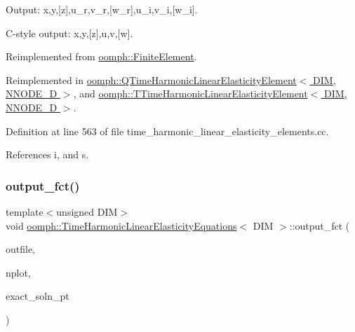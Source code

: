 Output\+: x,y,\mbox{[}z\mbox{]},u\+\_\+r,v\+\_\+r,\mbox{[}w\+\_\+r\mbox{]},u\+\_\+i,v\+\_\+i,\mbox{[}w\+\_\+i\mbox{]}. 

C-\/style output\+: x,y,\mbox{[}z\mbox{]},u,v,\mbox{[}w\mbox{]}. 

Reimplemented from \hyperlink{classoomph_1_1FiniteElement_adfaee690bb0608f03320eeb9d110d48c}{oomph\+::\+Finite\+Element}.



Reimplemented in \hyperlink{classoomph_1_1QTimeHarmonicLinearElasticityElement_a4d1ae51e639b76e695e2fc5a84b385ef}{oomph\+::\+Q\+Time\+Harmonic\+Linear\+Elasticity\+Element$<$ D\+I\+M, N\+N\+O\+D\+E\+\_\+D $>$}, and \hyperlink{classoomph_1_1TTimeHarmonicLinearElasticityElement_af31e14a1ea8ce2e3a8a9ebd83403d566}{oomph\+::\+T\+Time\+Harmonic\+Linear\+Elasticity\+Element$<$ D\+I\+M, N\+N\+O\+D\+E\+\_\+D $>$}.



Definition at line 563 of file time\+\_\+harmonic\+\_\+linear\+\_\+elasticity\+\_\+elements.\+cc.



References i, and s.

\mbox{\label{classoomph_1_1TimeHarmonicLinearElasticityEquations_a9b7deca877e8fbb4b20d0f3e9f732e69}} 
\subsubsection{\texorpdfstring{output\+\_\+fct()}{output\_fct()}}
{\footnotesize\ttfamily template$<$unsigned D\+IM$>$ \\
void \hyperlink{classoomph_1_1TimeHarmonicLinearElasticityEquations}{oomph\+::\+Time\+Harmonic\+Linear\+Elasticity\+Equations}$<$ D\+IM $>$\+::output\+\_\+fct (\begin{DoxyParamCaption}\item[{std\+::ostream \&}]{outfile,  }\item[{const unsigned \&}]{nplot,  }\item[{\hyperlink{classoomph_1_1FiniteElement_a690fd33af26cc3e84f39bba6d5a85202}{Finite\+Element\+::\+Steady\+Exact\+Solution\+Fct\+Pt}}]{exact\+\_\+soln\+\_\+pt }\end{DoxyParamCaption})\hspace{0.3cm}{\ttfamily [virtual]}}




